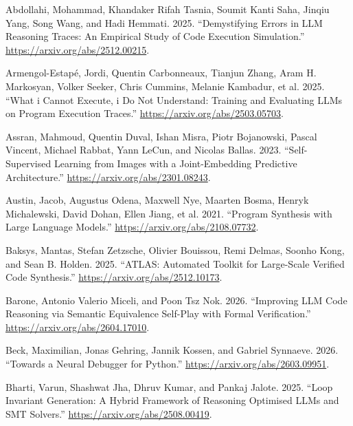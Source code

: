 \documentclass{article}
\newlength{\cslhangindent}
\newenvironment{CSLReferences}[2]
 {%
  \setlength{\parindent}{0pt}
  \everypar{\setlength{\hangindent}{\cslhangindent}}\ignorespaces
 }
 {\par}
\begin{document}
\hypertarget{refs}{}
\begin{CSLReferences}{1}{0}
\leavevmode{}%
Abdollahi, Mohammad, Khandaker Rifah Tasnia, Soumit Kanti Saha, Jinqiu
Yang, Song Wang, and Hadi Hemmati. 2025. {``Demystifying Errors in LLM
Reasoning Traces: An Empirical Study of Code Execution Simulation.''}
\url{https://arxiv.org/abs/2512.00215}.

\leavevmode{}%
Armengol-Estapé, Jordi, Quentin Carbonneaux, Tianjun Zhang, Aram H.
Markosyan, Volker Seeker, Chris Cummins, Melanie Kambadur, et al. 2025.
{``What i Cannot Execute, i Do Not Understand: Training and Evaluating
LLMs on Program Execution Traces.''}
\url{https://arxiv.org/abs/2503.05703}.

\leavevmode{}%
Assran, Mahmoud, Quentin Duval, Ishan Misra, Piotr Bojanowski, Pascal
Vincent, Michael Rabbat, Yann LeCun, and Nicolas Ballas. 2023.
{``Self-Supervised Learning from Images with a Joint-Embedding
Predictive Architecture.''} \url{https://arxiv.org/abs/2301.08243}.

\leavevmode{}%
Austin, Jacob, Augustus Odena, Maxwell Nye, Maarten Bosma, Henryk
Michalewski, David Dohan, Ellen Jiang, et al. 2021. {``Program Synthesis
with Large Language Models.''} \url{https://arxiv.org/abs/2108.07732}.

\leavevmode{}%
Baksys, Mantas, Stefan Zetzsche, Olivier Bouissou, Remi Delmas, Soonho
Kong, and Sean B. Holden. 2025. {``ATLAS: Automated Toolkit for
Large-Scale Verified Code Synthesis.''}
\url{https://arxiv.org/abs/2512.10173}.

\leavevmode{}%
Barone, Antonio Valerio Miceli, and Poon Tsz Nok. 2026. {``Improving LLM
Code Reasoning via Semantic Equivalence Self-Play with Formal
Verification.''} \url{https://arxiv.org/abs/2604.17010}.

\leavevmode{}%
Beck, Maximilian, Jonas Gehring, Jannik Kossen, and Gabriel Synnaeve.
2026. {``Towards a Neural Debugger for Python.''}
\url{https://arxiv.org/abs/2603.09951}.

\leavevmode{}%
Bharti, Varun, Shashwat Jha, Dhruv Kumar, and Pankaj Jalote. 2025.
{``Loop Invariant Generation: A Hybrid Framework of Reasoning Optimised
LLMs and SMT Solvers.''} \url{https://arxiv.org/abs/2508.00419}.


\end{CSLReferences}
\end{document}
